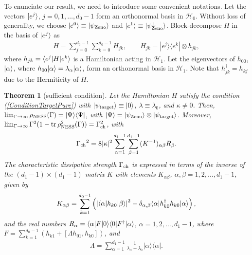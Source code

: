 \documentclass[aps,pra,letterpaper,twocolumn,showpacs,superscriptaddress,floatfix,longbibliography]{revtex4-1}
\newcommand{\tr}{\mathop{\mathrm{tr}}\limits}
\newtheorem{theorem}{Theorem} \newtheorem{lemma}{lemma}
\begin{document}
To enunciate our result, we need to introduce some convenient
notations.  Let the vectors $|{e^j}\rangle$, $j=0,1,\dots,d_0-1$ form an
orthonormal basis in $\mathcal{H}_0$.  Without loss of generality, we
choose $|{e^0}\rangle \equiv |{\psi_{\rm{Zeno}}}\rangle$ and $|{e^{1}}\rangle
\equiv |{\psi_{\rm{Zeno}}^\perp}\rangle$.  Block-decompose $H$ in the
basis of $|{e^j}\rangle $ as
\begin{align}
  H = \sum_{j=0}^{d_0-1}\sum_{k=0}^{d_0-1} H_{jk}, \qquad H_{jk} =
  |e^{j}\rangle \langle e^k | \otimes h_{jk},
  \label{Hdecomposition}
\end{align}
where $h_{jk}= \langle{e^{j}}| H |{e^{k}}\rangle$ is a Hamiltonian acting in
$\mathcal{H}_1$. Let the eigenvectors of $h_{00}$, $|{\alpha}\rangle$, where
$h_{00} |{\alpha}\rangle= \lambda_\alpha |{\alpha}\rangle$, form an orthonormal basis in
$\mathcal{H}_1$. Note that $h_{jk}^\dagger=h_{kj}$ due to the
Hermiticity of $H$.
\begin{theorem}[sufficient condition]
  \label{theorem2}
  Let the Hamiltonian $H$ satisfy the condition
  (\ref{ConditionTargetPure}) with $|{\psi_{\rm{target}}}\rangle \equiv
  |{0}\rangle$, $\lambda \equiv \lambda_0$, and $\kappa \neq 0$.  Then,
  $\lim_{\Gamma\to\infty} \rho_{\rm{NESS}}(\Gamma) =
  |{\Psi}\rangle\langle{\Psi}|$, with $|{\Psi }\rangle = |{\psi_{\rm{Zeno}}}\rangle
  \otimes |{\psi_{\rm{target}}}\rangle$.  Moreover,
  $\lim_{\Gamma\to\infty} \Gamma^2 ( 1 - \tr
  \rho^2_\mathrm{NESS}(\Gamma) ) = \Gamma_{\rm{ch}}^2$, with
  \begin{align}
    {\Gamma_{\rm{ch}}}^2 =8 |\kappa|^2 \sum_{\alpha=1}^{d_1-1}
    \sum_{\beta=1}^{d_1-1} (K^{-1})_{\alpha \beta} R_\beta.
    \label{ResGammaCharacteristic}
  \end{align}
  The characteristic dissipative strength $\Gamma_{\rm{ch}}$ is
  expressed in terms of the inverse of the $(d_1-1) \times (d_1-1) $
  matrix $K$ with elements $K_{\alpha\beta}$,
  $\alpha,\beta=1,2,\dots,d_1-1$, given by
  \begin{align}
    K_{\alpha\beta} = \sum_{k=1}^{d_0-1} \left( \left| \langle{\alpha}|
        h_{k0} |{\beta}\rangle \right|^2 - \delta_{\alpha,\beta}
      \langle{\alpha}| h_{k0}^\dagger h_{k0} |{\alpha}\rangle \right),
    \label{DefK}
  \end{align}
  and the real numbers $R_\alpha = \langle{\alpha}| F |{0}\rangle\langle{0}|
  F^{\dagger} |{\alpha}\rangle$, $\alpha=1,2,\dots,d_1-1$, where $ F =
  \sum_{k=1}^{d_0-1} \left( h_{k1} + \left[ \Lambda h_{01}, h_{k0}
    \right] \right)$, and
  \begin{align}
    \Lambda = \sum_{\alpha=1}^{d_1-1}
    \frac{1}{\lambda_\alpha-\lambda_0} | \alpha \rangle \langle \alpha
    |.
    \label{DefLambda}
  \end{align}
\end{theorem}
\end{document}
